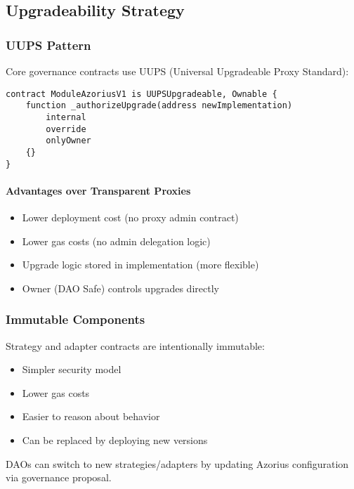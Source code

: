 \documentclass[11pt,a4paper]{article}
\begin{document}
\subsection{Upgradeability Strategy}

\subsubsection{UUPS Pattern}

Core governance contracts use UUPS (Universal Upgradeable Proxy Standard):

\begin{lstlisting}[caption=UUPS Upgrade Authorization]
contract ModuleAzoriusV1 is UUPSUpgradeable, Ownable {
    function _authorizeUpgrade(address newImplementation)
        internal
        override
        onlyOwner
    {}
}
\end{lstlisting}

\paragraph{Advantages over Transparent Proxies}
\begin{itemize}
    \item Lower deployment cost (no proxy admin contract)
    \item Lower gas costs (no admin delegation logic)
    \item Upgrade logic stored in implementation (more flexible)
    \item Owner (DAO Safe) controls upgrades directly
\end{itemize}

\subsubsection{Immutable Components}

Strategy and adapter contracts are intentionally immutable:
\begin{itemize}
    \item Simpler security model
    \item Lower gas costs
    \item Easier to reason about behavior
    \item Can be replaced by deploying new versions
\end{itemize}

DAOs can switch to new strategies/adapters by updating Azorius configuration via governance proposal.
\end{document}
